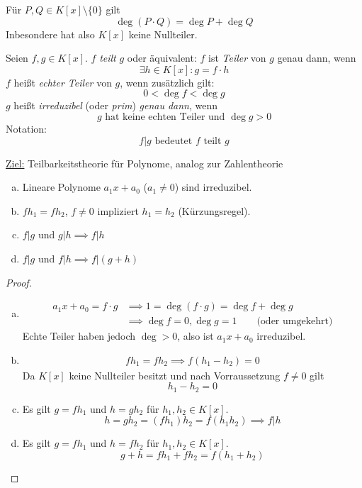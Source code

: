 \documentclass{mycourse}
\begin{document}
\begin{lem}
\label{10.11}
Für $P,Q\in K[x]\setminus\{0\}$ gilt
\[
\deg (P\cdot Q) = \deg P+\deg Q
\]
Inbesondere hat also $K[x]$ keine Nullteiler.
\end{lem}

\begin{df}
\label{10.12}
Seien $f,g\in K[x]$.
$f$ \emph{teilt} $g$ oder äquivalent: $f$ ist \emph{Teiler} von $g$ genau dann, wenn
\[
\exists h\in K[x]: g=f\cdot h
\]
$f$ heißt \emph{echter Teiler} von $g$, wenn zusätzlich gilt:
\[
0 < \deg f < \deg g
\]
$g$ heißt \emph{irreduzibel} (oder \emph{prim}) \emph{genau dann}, wenn
\[
\text{$g$ hat keine echten Teiler und $\deg g > 0$}
\]
Notation:
\[
f|g \text{ bedeutet } f \text{ teilt } g
\]
\end{df}

\underline{Ziel:} Teilbarkeitstheorie für Polynome, analog zur Zahlentheorie

\begin{lem}
\label{lem:10.13}
\begin{enumerate}[(a)]
\item
Lineare Polynome $a_1x+a_0$ ($a_1\neq 0$) sind irreduzibel.
\item
$fh_1=fh_2$, $f\neq 0$ impliziert $h_1=h_2$ (Kürzungsregel).
\item
$f|g$ und $g|h \implies f|h$
\item
$f|g$ und $f|h \implies f|(g+h)$
\end{enumerate}
\begin{proof}
\begin{enumerate}[(a)]
\item
\begin{align*}
a_1x+a_0=f\cdot g &\implies 1=\deg(f\cdot g) =\deg f + \deg g\\
&\implies \deg f = 0, \deg g=1 \qquad \text{(oder umgekehrt)}
\end{align*}
	Echte Teiler haben jedoch $\deg > 0$, also ist $a_1x + a_0$ irreduzibel.
\item
\begin{align*}
fh_1=fh_2 \implies f(h_1-h_2)=0
\end{align*}
Da $K[x]$ keine Nullteiler besitzt und nach Vorraussetzung $f\neq 0$ gilt
\[
h_1-h_2=0
\]
\item
Es gilt $g=fh_1$ und $h=gh_2$ für $h_1,h_2\in K[x]$.
\[
h=gh_2=(fh_1)h_2=f(h_1h_2)\implies f|h
\]
\item
Es gilt $g=fh_1$ und $h=fh_2$ für $h_1,h_2\in K[x]$.
\[
g+h=fh_1+fh_2=f(h_1+h_2)
\]
\end{enumerate}
\end{proof}
\end{lem}
\end{document}
